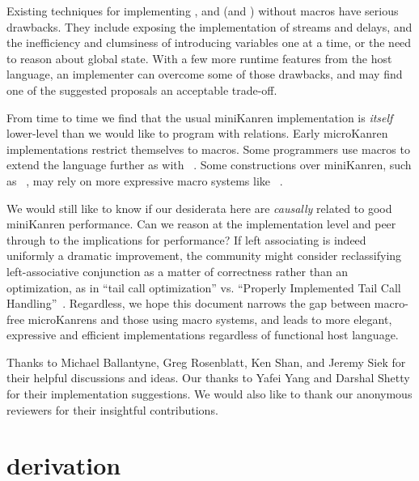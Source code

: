 \documentclass[sigplan,balance=true,pbalance=true,natbib=false]{acmart}
\begin{document}
Existing techniques for
implementing , 
and  (and ) without macros have
serious drawbacks. They include exposing the implementation of
streams and delays, and the inefficiency and clumsiness of introducing
variables one at a time, or the need to reason about global state. With
a few more runtime features from the host language, an implementer can
overcome some of those drawbacks, and may find one of the suggested
proposals an acceptable trade-off.

From time to time we find that the usual miniKanren implementation is
\emph{itself} lower-level than we would like to program with
relations. Early microKanren implementations restrict themselves
to  macros. Some programmers use macros to
extend the language further as
with ~\cite{keep2009pattern}. Some constructions
over miniKanren, such
as ~\cite{ballantyne2020macros}, may rely on
more expressive macro systems
like ~\cite{culpepper2012fortifying}.

We would still like to know if our desiderata here are \emph{causally}
related to good miniKanren performance. Can we reason at the
implementation level and peer through to the implications for
performance? If left associating  is indeed uniformly
a dramatic improvement, the community might consider reclassifying
left-associative conjunction as a matter of correctness rather than an
optimization, as in \enquote{tail call optimization} vs.
\enquote{Properly Implemented Tail Call
  Handling}~\cite{felleisen2014requestions}. Regardless, we hope this
document narrows the gap between macro-free microKanrens and those
using macro systems, and leads to more elegant, expressive and
efficient implementations regardless of functional host language.

\begin{acks}

  Thanks to Michael Ballantyne, Greg Rosenblatt, Ken Shan, and Jeremy
  Siek for their helpful discussions and ideas. Our thanks to Yafei
  Yang and Darshal Shetty for their implementation suggestions. We
  would also like to thank our anonymous reviewers for their
  insightful contributions.

\end{acks}

\printbibliography{}

\appendix

\section{ derivation}\label{sec:conda-derivation}
\end{document}
